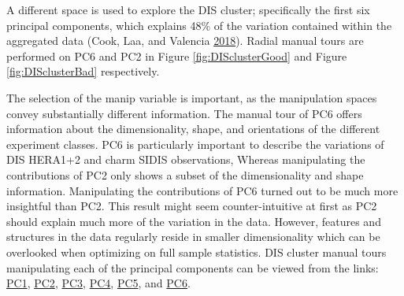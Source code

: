 A different space is used to explore the DIS cluster; specifically the
first six principal components, which explains 48\% of the variation
contained within the aggregated data (Cook, Laa, and Valencia
\protect\hyperlink{ref-cook_dynamical_2018}{2018}). Radial manual tours
are performed on PC6 and PC2 in Figure \ref{fig:DISclusterGood} and
Figure \ref{fig:DISclusterBad} respectively.

The selection of the manip variable is important, as the manipulation
spaces convey substantially different information. The manual tour of
PC6 offers information about the dimensionality, shape, and orientations
of the different experiment classes. PC6 is particularly important to
describe the variations of DIS HERA1+2 and charm SIDIS observations,
Whereas manipulating the contributions of PC2 only shows a subset of the
dimensionality and shape information. Manipulating the contributions of
PC6 turned out to be much more insightful than PC2. This result might
seem counter-intuitive at first as PC2 should explain much more of the
variation in the data. However, features and structures in the data
regularly reside in smaller dimensionality which can be overlooked when
optimizing on full sample statistics. DIS cluster manual tours
manipulating each of the principal components can be viewed from the
links:
\href{https://nspyrison.netlify.com/thesis/discluster_manualtour_pc1/}{PC1},
\href{https://nspyrison.netlify.com/thesis/discluster_manualtour_pc2/}{PC2},
\href{https://nspyrison.netlify.com/thesis/discluster_manualtour_pc3/}{PC3},
\href{https://nspyrison.netlify.com/thesis/discluster_manualtour_pc4/}{PC4},
\href{https://nspyrison.netlify.com/thesis/discluster_manualtour_pc5/}{PC5},
and
\href{https://nspyrison.netlify.com/thesis/discluster_manualtour_pc6/}{PC6}.

